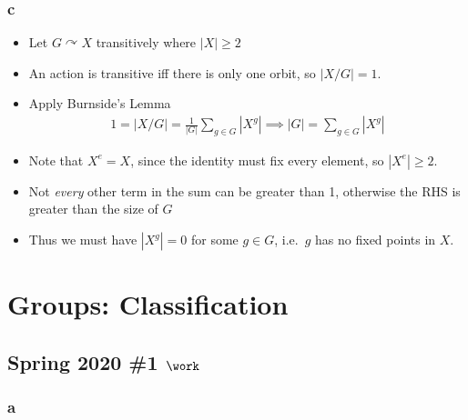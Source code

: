 \begin{solution}
\hypertarget{c-11}{%
\subsubsection{c}\label{c-11}}

\begin{itemize}
\tightlist
\item
  Let \(G\curvearrowright X\) transitively where
  \({\left\lvert {X} \right\rvert} \geq 2\)
\item
  An action is transitive iff there is only one orbit, so
  \({\left\lvert {X/G} \right\rvert} = 1\).
\item
  Apply Burnside's Lemma
  \begin{align*}
  1 = {\left\lvert {X/G} \right\rvert} = \frac{1}{{\left\lvert {G} \right\rvert}} \sum_{g\in G} {\left\lvert {X^g} \right\rvert} \implies {\left\lvert {G} \right\rvert} = \sum_{g\in G} {\left\lvert {X^g} \right\rvert}
  \end{align*}
\item
  Note that \(X^e = X\), since the identity must fix every element, so
  \({\left\lvert {X^e} \right\rvert} \geq 2\).
\item
  Not \emph{every} other term in the sum can be greater than 1,
  otherwise the RHS is greater than the size of \(G\)
\item
  Thus we must have \({\left\lvert {X^g} \right\rvert} = 0\) for some
  \(g\in G\), i.e.~\(g\) has no fixed points in \(X\).
\end{itemize}

\end{solution}

\hypertarget{groups-classification}{%
\section{Groups: Classification}\label{groups-classification}}

\hypertarget{spring-2020-1-work}{%
\subsection{\texorpdfstring{Spring 2020 \#1
\(\work\)}{Spring 2020 \#1 \textbackslash work}}\label{spring-2020-1-work}}

\hypertarget{a-19}{%
\subsubsection{a}\label{a-19}}

